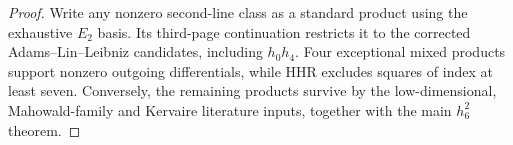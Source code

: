 \begin{proof}
Write any nonzero second-line class as a standard product using the exhaustive $E_2$ basis. Its third-page continuation restricts it to the corrected Adams--Lin--Leibniz candidates, including $h_0h_4$. Four exceptional mixed products support nonzero outgoing differentials, while HHR excludes squares of index at least seven. Conversely, the remaining products survive by the low-dimensional, Mahowald-family and Kervaire literature inputs, together with the main $h_6^2$ theorem.
\end{proof}
